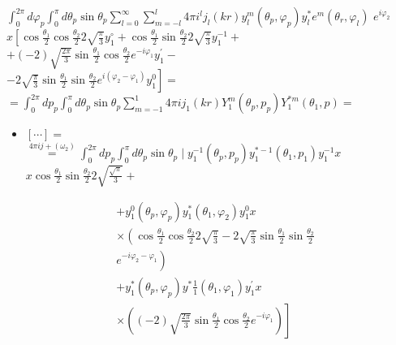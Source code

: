 \documentclass[10pt]{article}
\begin{document}
\(\int_{0}^{2 \pi} d \varphi_{p} \int_{0}^{\pi} d \theta_{p} \sin \theta_{p} \sum_{l=0}^{\infty} \sum_{m=-l}^{l} 4 \pi i^{l} j_{l}(k r) y_{l}^{m}\left(\theta_{p}, \varphi_{p}\right) y_{l}^{*} e^{m}\left(\theta_{r}, \varphi_{l}\right)\) \(e^{i \varphi_{2}}\)\\
\(x\left[\cos \frac{\theta_{1}}{2} \cos \frac{\theta_{2}}{2} 2 \sqrt{\frac{\pi}{3}} y_{1}^{\circ}+\cos \frac{\theta_{1}}{2} \sin \frac{\theta_{2}}{2} 2 \sqrt{\frac{\pi}{3}} y_{1}^{-1}+\right.\)\\
\(+(-2) \sqrt{\frac{2 \pi}{3}} \sin \frac{\theta_{1}}{2} \cos \frac{\theta_{2}}{2} e^{-i \varphi_{1}} y_{1}^{\prime}-\)\\
\(\left.-2 \sqrt{\frac{\pi}{3}} \sin \frac{\theta_{1}}{2} \sin \frac{\theta_{2}}{2} e^{i\left(\varphi_{2}-\varphi_{1}\right)} y_{1}^{0}\right]=\)\\
\(=\int_{0}^{2 \pi} d p_{p} \int_{0}^{\pi} d \theta_{p} \sin \theta_{p} \sum_{m=-1}^{1} 4 \pi i j_{1}(k r) Y_{1}^{m}\left(\theta_{p}, p_{p}\right) Y_{1}^{* m}\left(\theta_{1}, p\right)=\)

\begin{itemize}
  \item \([\cdots]=\)\\
\(\stackrel{4 \pi i j+\left(\omega_{2}\right)}{=} \int_{0}^{2 \pi} d p_{p} \int_{0}^{\pi} d \theta_{p} \sin \theta_{p} \mid y_{1}^{-1}\left(\theta_{p}, p_{p}\right) y_{1}^{*-1}\left(\theta_{1}, p_{1}\right) y_{1}^{-1} x\) \(x \cos \frac{\theta_{1}}{2} \sin \frac{\theta_{2}}{2} 2 \sqrt{\frac{\sqrt{\pi}}{3}}+\)
\end{itemize}

\[
\begin{aligned}
& +y_{1}^{0}\left(\theta_{p}, \varphi_{p}\right) y_{1}^{*}\left(\theta_{1}, \varphi_{2}\right) y_{1}^{0} x \\
& \times\left(\cos \frac{\theta_{1}}{2} \cos \frac{\theta_{2}}{2} 2 \sqrt{\frac{\pi}{3}}-2 \sqrt{\frac{\pi}{3}} \sin \frac{\theta_{1}}{2} \sin \frac{\theta_{2}}{2}\right. \\
& \left.e^{-i \varphi_{2}-\varphi_{1}}\right) \\
& +y_{1}^{*}\left(\theta_{p}, \varphi_{p}\right) y^{*} \frac{1}{1}\left(\theta_{1}, \varphi_{1}\right) y_{1}^{\prime} x \\
& \left.\times\left((-2) \sqrt{\frac{2 \pi}{3}} \sin \frac{\theta_{1}}{2} \cos \frac{\theta_{2}}{2} e^{-i \varphi_{1}}\right)\right]
\end{aligned}
\]
\end{document}
